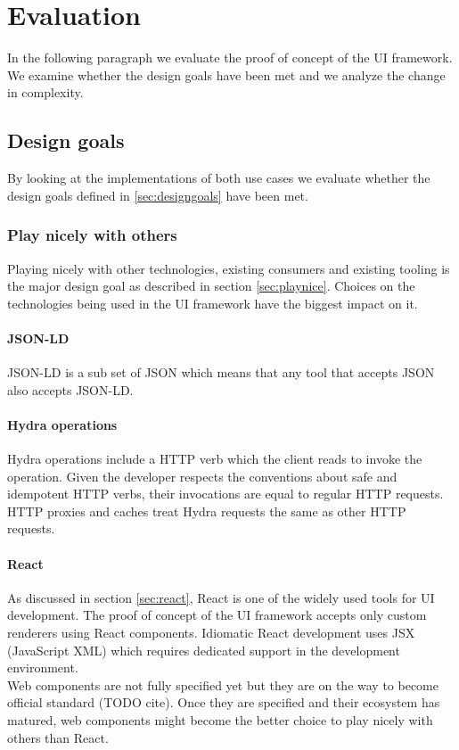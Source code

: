 \section{Evaluation}
In the following paragraph we evaluate the proof of concept of the UI framework. We examine whether the design goals have been met and we analyze the change in complexity.

\subsection{Design goals}
By looking at the implementations of both use cases we evaluate whether the design goals defined in \ref{sec:designgoals} have been met.

\subsubsection{Play nicely with others}
Playing nicely with other technologies, existing consumers and existing tooling is the major design goal as described in section \ref{sec:playnice}. Choices on the technologies being used in the UI framework have the biggest impact on it.

\paragraph{JSON-LD}
JSON-LD is a sub set of JSON which means that any tool that accepts JSON also accepts JSON-LD.

\paragraph{Hydra operations}
Hydra operations include a HTTP verb which the client reads to invoke the operation. Given the developer respects the conventions about safe and idempotent HTTP verbs, their invocations are equal to regular HTTP requests. HTTP proxies and caches treat Hydra requests the same as other HTTP requests.

\paragraph{React}
As discussed in section \ref{sec:react}, React is one of the widely used tools for UI development. The proof of concept of the UI framework accepts only custom renderers using React components. Idiomatic React development uses JSX (JavaScript XML) which requires dedicated support in the development environment. \\
Web components are not fully specified yet but they are on the way to become official standard (TODO cite). Once they are specified and their ecosystem has matured, web components might become the better choice to play nicely with others than React.

